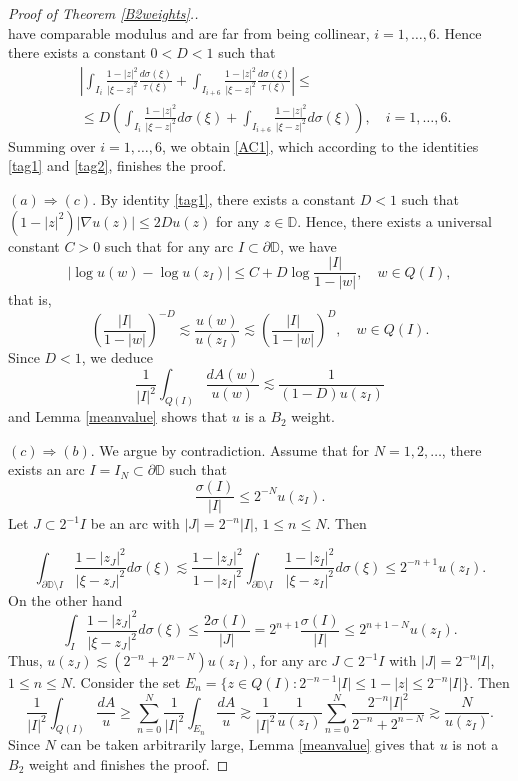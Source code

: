 \documentclass[a4paper,12pt]{article}
\theoremstyle{definition}
\numberwithin{equation}{section}
\newcommand{\D}{\mathbb D}
\begin{document}
\begin{proof}[Proof of Theorem \ref{B2weights}.]
$$$$
have comparable modulus and are far from being collinear, $i=1, \ldots , 6$. Hence there exists a constant $0<D<1$ such that
$$
\begin{aligned}
    & \left|\int_{I_{i}} \frac{1-|z|^{2}}{|\xi-z|^{2}} \frac{d \sigma(\xi)}{\tau(\xi)}+\int_{I_{i+6}} \frac{1-|z|^{2}}{|\xi-z|^{2}} \frac{d \sigma(\xi)}{\tau(\xi)}\right| \leq \\
& \leq D \left(\int_{I_{i}} \frac{1-|z|^{2}}{|\xi-z|^{2}} d \sigma (\xi)+\int_{I_{i+6}} \frac{1-|z|^{2}}{|\xi-z|^{2}} d \sigma (\xi)\right), \quad  i=1, \ldots, 6 .
\end{aligned}
$$
Summing over $i=1,\ldots, 6$, we obtain \eqref{AC1}, which according to the identities \eqref{tag1} and \eqref{tag2},  finishes the proof.

\medskip 

$(a) \Rightarrow(c)$. By identity \eqref{tag1}, there exists a constant $D<1$ such that $(1- |z|^2) |\nabla u (z)| \leq 2 D u (z)$ for any $z \in \D$. Hence, there exists a universal constant $C>0$ such that for any arc $I \subset \partial \D$, we have
$$
\left|\log u(w)-\log u\left(z_{I}\right)\right| \leq C+ D \log \frac{|I|}{1- |w|}, \quad  w \in Q(I), 
$$
that is,
$$
\left(\frac{|I|}{1- |w|}\right)^{-D} \lesssim \frac{u(w)}{u\left(z_{I}\right)} \lesssim \left(\frac{|I|}{1- |w|}\right)^{D}, \quad  w \in Q(I). 
$$
Since $D<1$, we deduce
$$
\frac{1}{|I|^{2}} \int_{Q(I)} \frac{d A(w)}{u(w)} \lesssim \frac{1}{(1- D)u\left(z_{I}\right)}
$$
and Lemma \ref{meanvalue} shows that $u$ is a $B_{2}$ weight. 

\medskip

$(c) \Rightarrow(b)$. We argue by contradiction. Assume that for $N=1,2, \ldots$, there exists an arc $I = I_N \subset \partial \mathbb{D}$ such that
$$
\frac{\sigma (I)}{|I|} \leq 2^{-N} u\left(z_{I}\right) .
$$
Let $ J \subset 2^{-1} I$ be an arc with $|J|=2^{-n} |I|$, $1 \leq n \leq N$. Then

$$
\int_{\partial \mathbb{D} \setminus  I} \frac{1-|z_{J}|^{2}}{\left|\xi-z_{J}\right|^{2}} d \sigma (\xi)  \lesssim \frac{1-\left|z_{J}\right|^2}{1-\left|z_{I}\right|^2} \int_{\partial \mathbb{D} \setminus  I} \frac{1-|z_{I}|^{2}}{\left|\xi-z_{I}\right|^{2}} d \sigma (\xi) 
 \leq 2^{-n + 1} u\left(z_{I}\right) . 
$$
On the other hand
$$
\int_{I} \frac{1-\left|z_{J}\right|^{2}}{\left|\xi-z_{J}\right|^{2}} d \sigma(\xi) \leq \frac{ 2 \sigma(I)}{|J|} =2^{n+1} \frac{\sigma(I)}{|I|}
 \leq 2^{n+1 -N} u\left(z_{I}\right) .
$$
Thus, $u\left(z_{J}\right) \lesssim \left(2^{-n}+2^{n-N}\right) u\left(z_{I}\right)$, for any arc $J \subset 2^{-1} I$ with $|J|=2^{-n} |I| $, $1 \leq n \leq N$. Consider the set $E_n =  \{ z \in Q(I): 2^{-n-1} |I| \leq 1- |z| \leq 2^{-n} |I |\}$. Then 
$$
\frac{1}{|I|^2}  \int_{Q(I)} \frac{d A}{u} \geq \sum_{n=0}^N \frac{1}{|I|^{2}} \int_{E_n} \frac{d A}{u} \gtrsim \frac{1}{|I|^{2}} \frac{1}{u (z_{I} )} \sum_{n=0}^{N} \frac{2^{-n}|I|^{2}}{2^{-n}+2^{n-N}} \gtrsim  \frac{N}{u\left(z_{I}\right)} . 
$$
Since $N$ can be taken arbitrarily large, Lemma \ref{meanvalue} gives that $u$ is not a $ B_{2}$ weight and finishes the proof. 
\end{proof}
\end{document}
